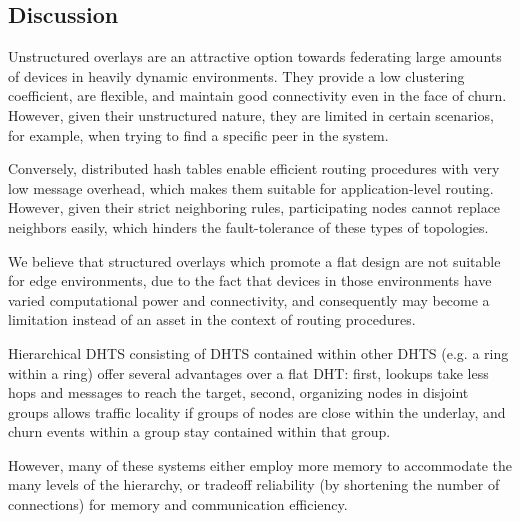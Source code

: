 \subsection{Discussion}

Unstructured overlays are an attractive option towards federating large amounts of devices in heavily dynamic environments. They provide a low clustering coefficient, are flexible, and maintain good connectivity even in the face of churn. However, given their unstructured nature, they are limited in certain scenarios, for example, when trying to find a specific peer in the system.

Conversely, distributed hash tables enable efficient routing procedures with very low message overhead, which makes them suitable for application-level routing. However, given their strict neighboring rules, participating nodes cannot replace neighbors easily, which hinders the fault-tolerance of these types of topologies.

We believe that structured overlays which promote a flat design are not suitable for edge environments, due to the fact that devices in those environments have varied computational power and connectivity, and consequently may become a limitation instead of an asset in the context of routing procedures. 

Hierarchical DHTS consisting of DHTS contained within other DHTS (e.g. a ring within a ring) offer several advantages over a flat DHT: first, lookups take less hops and messages to reach the target, second, organizing nodes in disjoint groups allows traffic locality if groups of nodes are close within the underlay, and churn events within a group stay contained within that group. 

However, many of these systems either employ more memory to accommodate the many levels of the hierarchy, or tradeoff reliability (by shortening the number of connections) for memory and communication efficiency. 

